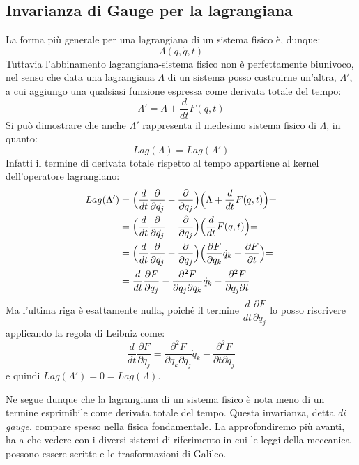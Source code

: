 \documentclass[a4paper,openany]{article}
\begin{document}
	\subsection{Invarianza di Gauge per la lagrangiana}
	La forma più generale per una lagrangiana di un sistema fisico è, dunque:
	\begin{equation}
		\Lambda(q,\dot{q},t)
	\end{equation}
	Tuttavia l'abbinamento lagrangiana-sistema fisico non è perfettamente biunivoco, nel senso che data una lagrangiana $\Lambda$ di un sistema posso costruirne un'altra, $\Lambda'$, a cui aggiungo una qualsiasi funzione espressa come derivata totale del tempo:
	\begin{equation}
		\Lambda' = \Lambda + \dfrac{d}{dt}F(q,t)
	\end{equation}
	Si può dimostrare che anche $\Lambda'$ rappresenta il medesimo sistema fisico di $\Lambda$, in quanto:
	\begin{equation}
		Lag(\Lambda) = Lag(\Lambda')
	\end{equation}
	Infatti il termine di derivata totale rispetto al tempo appartiene al kernel dell'operatore lagrangiano:
	\begin{align}
		Lag(\Lambda') &= \Bigl(\frac{d}{dt}\dfrac{\partial}{\partial \dot{q_{j}}} - \dfrac{\partial}{\partial q_{j}}\Bigl)\Bigl(\Lambda + \dfrac{d}{dt}F(q,t)\Bigl) = \\
		&= \Bigl(\frac{d}{dt}\dfrac{\partial}{\partial \dot{q_{j}}} - \dfrac{\partial}{\partial q_{j}}\Bigl)\Bigl(\dfrac{d}{dt}F(q,t)\Bigl) = \\
		&= \Bigl(\frac{d}{dt}\dfrac{\partial}{\partial \dot{q_{j}}} - \dfrac{\partial}{\partial q_{j}}\Bigl) \Bigl(\dfrac{\partial F}{\partial q_{k}} \dot{q}_{k} +\dfrac{\partial F}{\partial t}\Bigl) = \\
		&= \dfrac{d}{dt}\dfrac{\partial F}{\partial q_{j}} - \dfrac{\partial^{2}F}{\partial q_{j}\partial q_{k}}\dot{q}_{k} - \dfrac{\partial ^{2}F}{\partial q_{j}\partial t }
	\end{align}
	Ma l'ultima riga è esattamente nulla, poiché il termine $\dfrac{d}{dt}\dfrac{\partial F}{\partial q_{j}}$ lo posso riscrivere applicando la regola di Leibniz come:
	$$
	\dfrac{d}{dt}\dfrac{\partial F}{\partial q_{j}} = \dfrac{\partial^{2} F}{\partial q_{k}\partial q_{j}}\dot{q}_{k} - \dfrac{\partial^{2} F}{\partial t\partial q_{j}}
	$$
	e quindi $Lag(\Lambda') = 0 = Lag(\Lambda)$. 
	
	Ne segue dunque che la lagrangiana di un sistema fisico è nota meno di un termine esprimibile come derivata totale del tempo. Questa invarianza, detta \textit{di gauge}, compare spesso nella fisica fondamentale. La approfondiremo più avanti, ha a che vedere con i diversi sistemi di riferimento in cui le leggi della meccanica possono essere scritte e le trasformazioni di Galileo.
\end{document}
